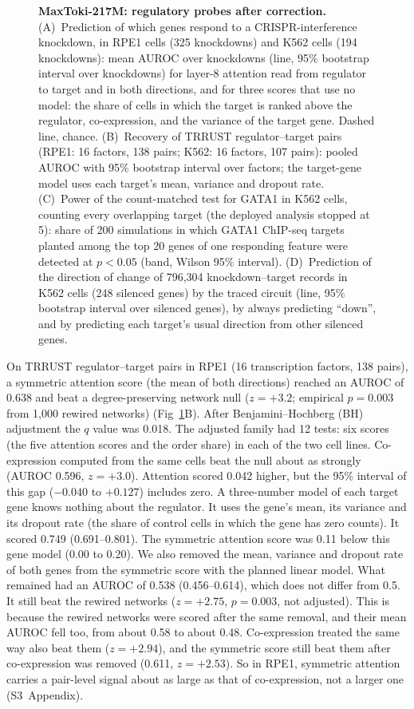 \documentclass[10pt,letterpaper]{article}
\begin{document}
\begin{figure}[H]
\caption{\textbf{MaxToki-217M: regulatory probes after correction.}
(A)~Prediction of which genes respond to a CRISPR-interference knockdown,
in RPE1 cells (325 knockdowns) and K562 cells (194 knockdowns): mean
AUROC over knockdowns (line, 95\% bootstrap interval over knockdowns) for
layer-8 attention read from regulator to target and in both directions,
and for three scores that use no model: the share of cells in which the
target is ranked above the regulator, co-expression, and the variance of
the target gene. Dashed line, chance. (B)~Recovery of TRRUST
regulator--target pairs (RPE1: 16 factors, 138 pairs; K562: 16 factors,
107 pairs): pooled AUROC with 95\% bootstrap interval over factors; the
target-gene model uses each target's mean, variance and dropout rate.
(C)~Power of the count-matched test for GATA1 in K562 cells, counting
every overlapping target (the deployed analysis stopped at 5): share of
200 simulations in which GATA1 ChIP-seq targets planted among the top 20
genes of one responding feature were detected at $p<0.05$ (band, Wilson
95\% interval). (D)~Prediction of the direction of change of 796,304
knockdown--target records in K562 cells (248 silenced genes) by the
traced circuit (line, 95\% bootstrap interval over silenced genes), by
always predicting ``down'', and by predicting each target's usual
direction from other silenced genes.}
\label{fig:caseReg}
\end{figure}

On TRRUST regulator--target pairs in RPE1 (16 transcription factors, 138
pairs), a symmetric attention score (the mean of both directions) reached
an AUROC of 0.638 and beat a degree-preserving network null ($z = +3.2$;
empirical $p = 0.003$ from 1,000 rewired networks)
(Fig~\ref{fig:caseReg}B). After Benjamini--Hochberg (BH) adjustment the
$q$ value was 0.018. The adjusted family had 12 tests: six scores (the
five attention scores and the order share) in each of the two cell
lines. Co-expression computed from the same cells beat the null about as
strongly (AUROC 0.596, $z = +3.0$). Attention scored 0.042 higher, but
the 95\% interval of this gap ($-0.040$ to $+0.127$) includes zero. A
three-number model of each target gene knows nothing about the
regulator. It uses the gene's mean, its variance and its dropout rate
(the share of control cells in which the gene has zero counts). It scored
0.749 (0.691--0.801). The symmetric attention score was 0.11 below this
gene model (0.00 to 0.20). We also removed the mean, variance and
dropout rate of both genes from the symmetric score with the planned
linear model. What remained had an AUROC of 0.538 (0.456--0.614), which
does not differ from 0.5. It still beat the rewired networks
($z = +2.75$, $p = 0.003$, not adjusted). This is because the rewired
networks were scored after the same removal, and their mean AUROC fell
too, from about 0.58 to about 0.48. Co-expression treated the same way
also beat them ($z = +2.94$), and the symmetric score still beat them
after co-expression was removed
(0.611, $z = +2.53$). So in RPE1, symmetric attention carries a
pair-level signal about as large as that of co-expression, not a larger
one (S3~Appendix).
\end{document}

